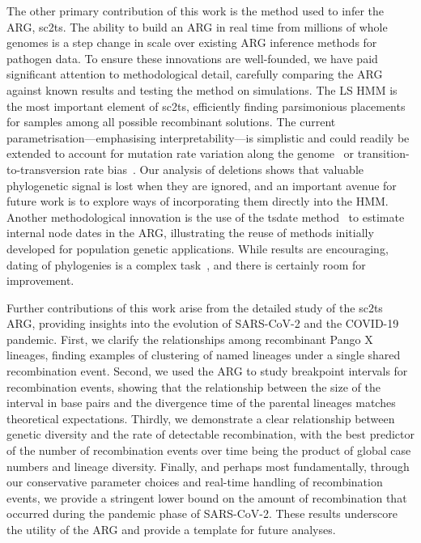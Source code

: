 \documentclass[12pt]{article}
\begin{document}
The other primary contribution of this work is the method used to
infer the ARG, sc2ts.
The ability to build an ARG in real time from millions of whole
genomes is a step change in scale over existing ARG
inference methods for pathogen data\cite{Didelot2010inference,%
Vaughan2017inferring,%
Muller2020bayesian,%
Ignatieva2022,%
Muller2022bayesian}.
To ensure these innovations are well-founded, we have paid significant
attention to methodological detail, carefully comparing the ARG
against known results and testing the method on simulations.
The LS HMM is the most important element of
sc2ts, efficiently finding parsimonious placements for samples
among all possible recombinant solutions. The current
parametrisation---emphasising interpretability---is simplistic
and could readily be extended to account
for mutation rate variation along the genome~\cite{Haddox2025}
or transition-to-transversion rate bias~\cite{Bloom2023,Simmonds2024}.
Our analysis of deletions shows that valuable phylogenetic signal
is lost when they are ignored, and an important avenue for
future work is to explore ways of incorporating them directly into the HMM.
Another methodological innovation is the use of
the tsdate method~\cite{Wohns2022,Pope2025} to estimate internal node dates
in the ARG, illustrating the reuse of methods initially developed
for population genetic applications. While results are encouraging,
dating of phylogenies is a complex task~\cite{Kumar2016advances},
and there is certainly room for improvement.

Further contributions of this work arise from
the detailed study of the sc2ts ARG,
providing insights into the evolution of SARS-CoV-2
and the COVID-19 pandemic.
First, we clarify the relationships among
recombinant Pango X lineages, finding examples of
clustering of named lineages under a single shared recombination event.
Second, we used the ARG to study breakpoint intervals
for recombination events, showing that the relationship between the
size of the interval in base pairs and the divergence time of the parental lineages matches theoretical expectations.
Thirdly, we demonstrate a clear relationship between
genetic diversity and the rate of detectable recombination,
with the best predictor of the number of recombination
events over time being the product of global case numbers
and lineage diversity.
Finally, and perhaps most fundamentally, through our
conservative parameter choices and real-time handling of
recombination events, we provide a stringent lower
bound on the amount of recombination that occurred during
the pandemic phase of SARS-CoV-2.
These results underscore the utility of the ARG
and provide a template for future analyses.
\end{document}
